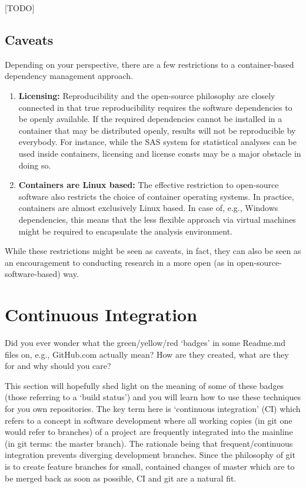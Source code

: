 \documentclass[]{book}
\providecommand{\tightlist}{%
  \setlength{\itemsep}{0pt}\setlength{\parskip}{0pt}}
\begin{document}
{[}TODO{]}

\section{Caveats}\label{caveats}

Depending on your perspective, there are a few restrictions to a
container-based dependency management approach.

\begin{enumerate}
\def\labelenumi{\arabic{enumi}.}
\tightlist
\item
  \textbf{Licensing:} Reproducibility and the open-source philosophy are
  closely connected in that true reproducibility requires the software
  dependencies to be openly available. If the required dependencies
  cannot be installed in a container that may be distributed openly,
  results will not be reproducible by everybody. For instance, while the
  SAS system for statistical analyses can be used inside containers,
  licensing and license consts may be a major obstacle in doing so.
\item
  \textbf{Containers are Linux based:} The effective restriction to
  open-source software also restricts the choice of container operating
  systems. In practice, containers are almost exclusively Linux based.
  In case of, e.g., Windows dependencies, this means that the less
  flexible approach via virtual machines might be required to
  encapsulate the analysis environment.
\end{enumerate}

While these restrictions might be seen as caveats, in fact, they can
also be seen as an encouragement to conducting research in a more open
(as in open-source-software-based) way.

\chapter{Continuous Integration}\label{chptr-continuous-integration}

Did you ever wonder what the green/yellow/red `badges' in some Readme.md
files on, e.g., GitHub.com actually mean? How are they created, what are
they for and why should you care?

This section will hopefully shed light on the meaning of some of these
badges (those referring to a `build status') and you will learn how to
use these techniques for you own repositories. The key term here is
`continuous integration' (CI) which refers to a concept in software
development where all working copies (in git one would refer to
branches) of a project are frequently integrated into the mainline (in
git terms: the master branch). The rationale being that
frequent/continuous integration prevents diverging development branches.
Since the philosophy of git is to create feature branches for small,
contained changes of master which are to be merged back as soon as
possible, CI and git are a natural fit.
\end{document}
